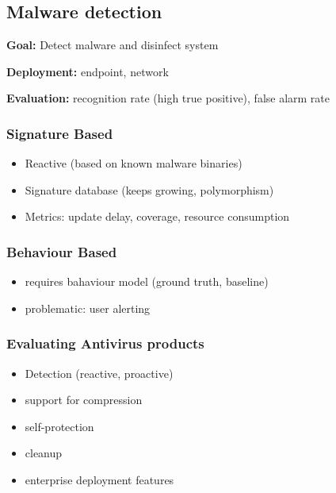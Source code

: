 \documentclass[fs, footer]{latex4ei}
\begin{document}
\begin{multicols*}{4}
{  \subsection{Malware detection}

  \textbf{Goal:} Detect malware and disinfect system 

  \textbf{Deployment:} endpoint, network

  \textbf{Evaluation:} recognition rate (high true positive), false alarm rate 


  \subsubsection{Signature Based}
  \begin{itemize}
   	\item Reactive (based on known malware binaries)
   	\item Signature database (keeps growing, polymorphism)
   	\item Metrics: update delay, coverage, resource consumption
   \end{itemize} 

     \subsubsection{Behaviour Based}
  \begin{itemize}
   	\item requires bahaviour model (ground truth, baseline)
   	\item problematic: user alerting
   \end{itemize} 

   \subsubsection{Evaluating Antivirus products}

   \begin{itemize}
    	\item Detection (reactive, proactive)
    	\item support for compression
    	\item self-protection
    	\item cleanup
    	\item enterprise deployment features
    \end{itemize} 
}  \sectionbox{
}
\end{multicols*}
\end{document}
